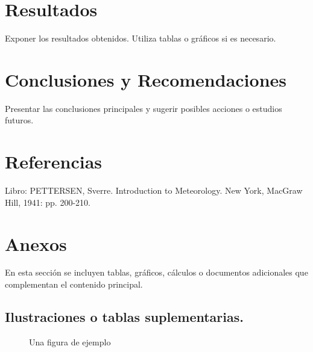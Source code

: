 \documentclass[a4paper,12pt]{article}
\begin{document}
\begin{Form}
\section{Resultados}
Exponer los resultados obtenidos. Utiliza tablas o gráficos si es necesario.

\section{Conclusiones y Recomendaciones}
Presentar las conclusiones principales y sugerir posibles acciones o estudios futuros.

\section{Referencias}
Libro: PETTERSEN, Sverre. Introduction to Meteorology. New York, MacGraw Hill, 1941: pp. 200-210.


\appendix
\section{Anexos}
En esta sección se incluyen tablas, gráficos, cálculos o documentos adicionales que complementan el contenido principal.

\subsection{Ilustraciones o tablas suplementarias.}
\misdatos

\begin{figure}[ht]
    \centering
    \caption{Una figura de ejemplo} %
\end{figure}


\datosNoNumericos


\end{Form}
\end{document}
